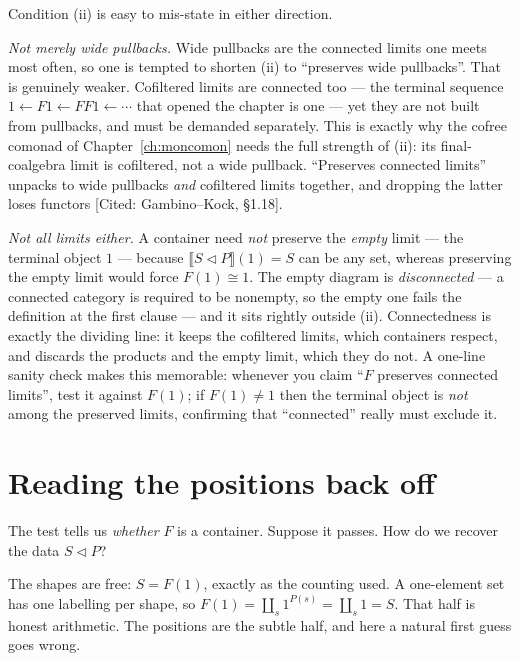 \documentclass[11pt,a4paper]{book}
\newcommand{\cont}[2]{#1 \triangleleft #2}
\newcommand{\Ext}[1]{\llbracket #1 \rrbracket}
\theoremstyle{plain}
\theoremstyle{definition}
\theoremstyle{remark}
\newcommand{\prov}[1]{\hfill\textsf{\footnotesize[#1]}}
\begin{document}
\begin{teachbox}
Condition (ii) is easy to mis-state in either direction.

\emph{Not merely wide pullbacks.} Wide pullbacks are the connected limits one meets
most often, so one is tempted to shorten (ii) to ``preserves wide pullbacks''. That
is genuinely weaker. Cofiltered limits are connected too --- the terminal sequence
$1\leftarrow F1\leftarrow FF1\leftarrow\cdots$ that opened the chapter is one --- yet
they are not built from pullbacks, and must be demanded separately. This is exactly
why the cofree comonad of Chapter~\ref{ch:moncomon} needs the full strength of (ii):
its final-coalgebra limit is cofiltered, not a wide pullback. ``Preserves connected
limits'' unpacks to wide pullbacks \emph{and} cofiltered limits together, and
dropping the latter loses functors \prov{Cited: Gambino--Kock, \S1.18}.

\emph{Not all limits either.} A container need \emph{not} preserve the \emph{empty}
limit --- the terminal object $1$ --- because $\Ext{\cont SP}(1)=S$ can be any set,
whereas preserving the empty limit would force $F(1)\cong1$. The empty diagram is
\emph{disconnected} --- a connected category is required to be nonempty, so the
empty one fails the definition at the first clause --- and it sits rightly outside
(ii). Connectedness is exactly the dividing
line: it keeps the cofiltered limits, which containers respect, and discards the
products and the empty limit, which they do not. A one-line sanity check makes this
memorable: whenever you claim ``$F$ preserves connected limits'', test it against
$F(1)$; if $F(1)\neq1$ then the terminal object is \emph{not} among the preserved
limits, confirming that ``connected'' really must exclude it.
\end{teachbox}

\section{Reading the positions back off}
\label{sec:recover}

The test tells us \emph{whether} $F$ is a container. Suppose it passes. How do we
recover the data $\cont SP$?

The shapes are free: $S=F(1)$, exactly as the counting used. A one-element set has
one labelling per shape, so $F(1)=\coprod_s 1^{P(s)}=\coprod_s 1=S$. That half is
honest arithmetic. The positions are the subtle half, and here a natural first
guess goes wrong.
\end{document}
